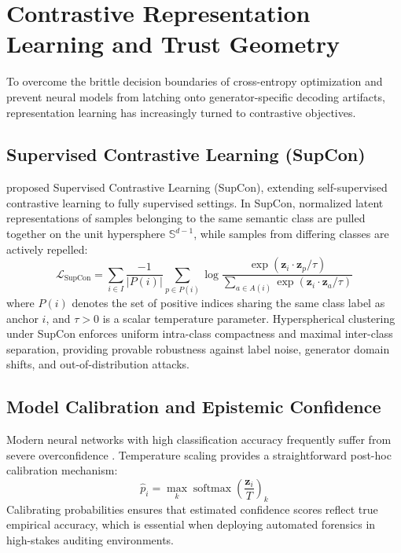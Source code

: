 \section{Contrastive Representation Learning and Trust Geometry}
\label{sec:rel_representation_learning}

To overcome the brittle decision boundaries of cross-entropy optimization and prevent neural models from latching onto generator-specific decoding artifacts, representation learning has increasingly turned to contrastive objectives.

\subsection{Supervised Contrastive Learning (SupCon)}
\citet{khosla2020supervised} proposed Supervised Contrastive Learning (SupCon), extending self-supervised contrastive learning to fully supervised settings. In SupCon, normalized latent representations of samples belonging to the same semantic class are pulled together on the unit hypersphere $\mathbb{S}^{d-1}$, while samples from differing classes are actively repelled:
\begin{equation}
\label{eq:supcon_loss_relwork}
\mathcal{L}_{\text{SupCon}} = \sum_{i \in I} \frac{-1}{|P(i)|} \sum_{p \in P(i)} \log \frac{\exp(\bm{z}_i \cdot \bm{z}_p / \tau)}{\sum_{a \in A(i)} \exp(\bm{z}_i \cdot \bm{z}_a / \tau)}
\end{equation}
where $P(i)$ denotes the set of positive indices sharing the same class label as anchor $i$, and $\tau > 0$ is a scalar temperature parameter. Hyperspherical clustering under SupCon enforces uniform intra-class compactness and maximal inter-class separation, providing provable robustness against label noise, generator domain shifts, and out-of-distribution attacks.

\subsection{Model Calibration and Epistemic Confidence}
Modern neural networks with high classification accuracy frequently suffer from severe overconfidence \citep{guo2017calibration}. Temperature scaling provides a straightforward post-hoc calibration mechanism:
\begin{equation}
\hat{p}_i = \max_k \operatorname{softmax}\left(\frac{\mathbf{z}_i}{T}\right)_k
\end{equation}
Calibrating probabilities ensures that estimated confidence scores reflect true empirical accuracy, which is essential when deploying automated forensics in high-stakes auditing environments.

